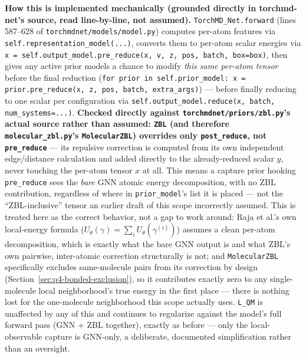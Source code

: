 \documentclass[11pt]{article}
\begin{document}
\textbf{How this is implemented mechanically (grounded directly in
torchmd-net's source, read line-by-line, not assumed).}
\texttt{TorchMD\_Net.forward} (lines 587--628 of
\texttt{torchmdnet/models/model.py}) computes per-atom features via
\texttt{self.representation\_model(...)}, converts them to per-atom scalar
energies via \texttt{x = self.output\_model.pre\_reduce(x, v, z, pos,
batch, box=box)}, then gives any active prior models a chance to modify
\emph{this same per-atom tensor} before the final reduction
(\texttt{for prior in self.prior\_model: x = prior.pre\_reduce(x, z, pos,
batch, extra\_args)}) --- before finally reducing to one scalar per
configuration via \texttt{self.output\_model.reduce(x, batch,
num\_systems=...)}. \textbf{Checked directly against
\texttt{torchmdnet/priors/zbl.py}'s actual source rather than assumed:
\texttt{ZBL} (and therefore \texttt{molecular\_zbl.py}'s
\texttt{MolecularZBL}) overrides only \texttt{post\_reduce}, not
\texttt{pre\_reduce}} --- its repulsive correction is computed from its own
independent edge/distance calculation and added directly to the
already-reduced scalar $y$, never touching the per-atom tensor $x$ at all.
This means a capture prior hooking \texttt{pre\_reduce} sees the
\emph{bare} GNN atomic energy decomposition, with no ZBL contribution,
regardless of where in \texttt{prior\_model}'s list it is placed --- not
the ``ZBL-inclusive'' tensor an earlier draft of this scope incorrectly
assumed. This is treated here as the correct behavior, not a gap to work
around: Raja et al.'s own local-energy formula
($U_\theta(\gamma)=\sum_i U_\theta(\gamma^{(i)})$) assumes a clean
per-atom decomposition, which is exactly what the bare GNN output is and
what ZBL's own pairwise, inter-atomic correction structurally is not; and
\texttt{MolecularZBL} specifically excludes same-molecule pairs from its
correction by design (Section~\ref{sec:q4-bonded-exclusion}), so it
contributes exactly zero to any single-molecule local neighborhood's true
energy in the first place --- there is nothing lost for the one-molecule
neighborhood this scope actually uses. \texttt{L\_QM} is unaffected by any
of this and continues to regularize against the model's full forward pass
(GNN + ZBL together), exactly as before --- only the local-observable
capture is GNN-only, a deliberate, documented simplification rather than
an oversight.
\end{document}
